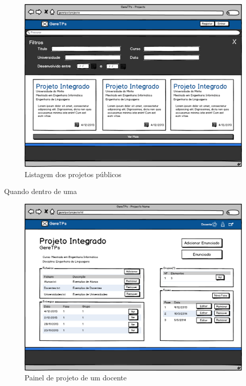\begin{figure}[htbp] 
        \centering
        \includegraphics[width=1\textwidth]{images/prototipos/mockups/Projetos.png}
         \caption{Listagem dos projetos públicos}
         \label{fig: projetospublicos}
\end{figure}


Quando dentro de uma 

\begin{figure}[htbp] 
        \centering
        \includegraphics[width=1\textwidth]{images/prototipos/mockups/painelprojetodocente.png}
         \caption{Painel de projeto de um docente}
         \label{fig: painelprojetodocente}
\end{figure}

